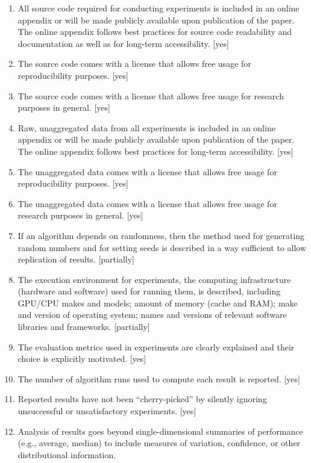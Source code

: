 \begin{enumerate}
    \item
    All source code required for conducting experiments is included in an online appendix
    or will be made publicly available upon publication of the paper.
    The online appendix follows best practices for source code readability and documentation as well as for long-term accessibility.
    [yes]
    \item The source code comes with a license that
    allows free usage for reproducibility purposes.
    [yes]
    \item The source code comes with a license that
    allows free usage for research purposes in general.
    [yes]
    \item
    Raw, unaggregated data from all experiments is included in an online appendix
    or will be made publicly available upon publication of the paper.
    The online appendix follows best practices for long-term accessibility.
    [yes]
    \item The unaggregated data comes with a license that
    allows free usage for reproducibility purposes.
    [yes]
    \item The unaggregated data comes with a license that
    allows free usage for research purposes in general.
    [yes]
    \item If an algorithm depends on randomness, then the method used for generating random numbers and for setting seeds is described in a way sufficient to allow replication of results.
    [partially]
    \item The execution environment for experiments, the computing infrastructure (hardware and software) used for running them, is described, including GPU/CPU makes and models; amount of memory (cache and RAM); make and version of operating system; names and versions of relevant software libraries and frameworks.
    [partially]
    \item
    The evaluation metrics used in experiments are clearly explained and their choice is explicitly motivated.
    [yes]
    \item
    The number of algorithm runs used to compute each result is reported.
    [yes]
    \item
    Reported results have not been ``cherry-picked'' by silently ignoring unsuccessful or unsatisfactory experiments.
    [yes]
    \item
    Analysis of results goes beyond single-dimensional summaries of performance (e.g., average, median) to include measures of variation, confidence, or other distributional information.

\end{enumerate}
